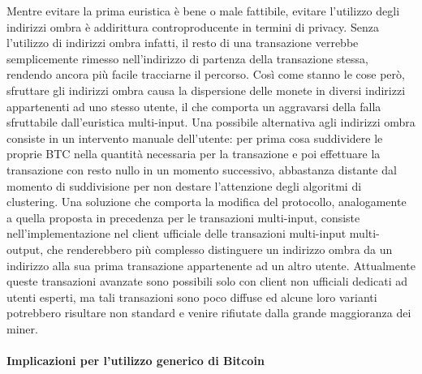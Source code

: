 Mentre evitare la prima euristica è bene o male fattibile, evitare l'utilizzo degli indirizzi ombra è addirittura controproducente in termini di privacy. Senza l'utilizzo di indirizzi ombra infatti, il resto di una transazione verrebbe semplicemente rimesso nell'indirizzo di partenza della transazione stessa, rendendo ancora più facile tracciarne il percorso.
Così come stanno le cose però, sfruttare gli indirizzi ombra causa la dispersione delle monete in diversi indirizzi appartenenti ad uno stesso utente, il che comporta un aggravarsi della falla sfruttabile dall'euristica multi-input.
Una possibile alternativa agli indirizzi ombra consiste in un intervento manuale dell'utente: per prima cosa suddividere le proprie BTC nella quantità necessaria per la transazione e poi effettuare la transazione con resto nullo in un momento successivo, abbastanza distante dal momento di suddivisione per non destare l'attenzione degli algoritmi di clustering.
Una soluzione che comporta la modifica del protocollo, analogamente a quella proposta in precedenza per le transazioni multi-input, consiste nell'implementazione nel client ufficiale delle transazioni multi-input multi-output, che renderebbero più complesso distinguere un indirizzo ombra da un indirizzo alla sua prima transazione appartenente ad un altro utente. Attualmente queste transazioni avanzate sono possibili solo con client non ufficiali dedicati ad utenti esperti, ma tali transazioni sono poco diffuse ed alcune loro varianti potrebbero risultare non standard e venire rifiutate dalla grande maggioranza dei miner.

\paragraph{Implicazioni per l'utilizzo generico di Bitcoin}

